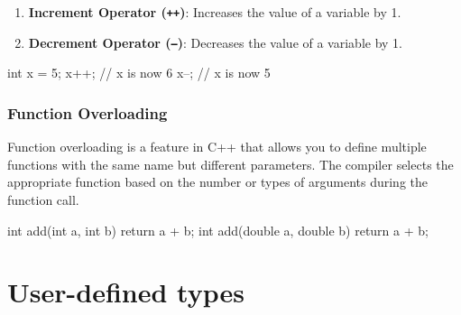 \begin{enumerate}
    \item \textbf{Increment Operator (\texttt{++})}: Increases the value of a variable by 1.
    \item \textbf{Decrement Operator (\texttt{--})}: Decreases the value of a variable by 1.
\end{enumerate}

\begin{exampleblock}
\begin{codeblock}[language=C++]
int x = 5;
x++; // x is now 6
x--; // x is now 5
\end{codeblock}
\end{exampleblock}

\subsubsection{Function Overloading}
Function overloading is a feature in C++ that allows you to define multiple functions with the
same name but different parameters. The compiler selects the appropriate function based on the number or types of arguments
during the function call.

\begin{exampleblock}
\begin{codeblock}[language=C++]
int add(int a, int b) {
    return a + b;
}
int add(double a, double b) {
    return a + b;
}
\end{codeblock}
\end{exampleblock}



\newpage
\section{User-defined types}

